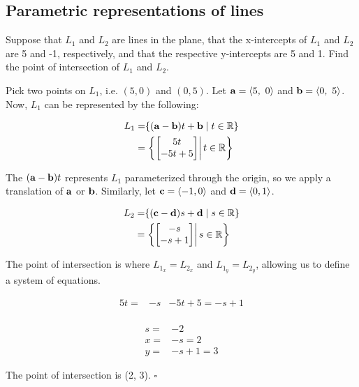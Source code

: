 \documentclass[../main.tex]{subfiles}
\begin{document}
\subsection{Parametric representations of lines}

\begin{example}
	Suppose that $L_1$ and $L_2$ are lines in the plane, that the
	x-intercepts of $L_1$ and $L_2$ are 5 and -1, respectively, and that the
	respective y-intercepts are 5 and 1. Find the point of intersection
	of $L_1$ and $L_2$.
\end{example}

\begin{solution}
	Pick two points on $L_1$,
	i.e. $(5, 0)$ and $(0, 5)$. Let $\mathbf{a}=\langle 5,\ 0\rangle$ and $\mathbf{b}=\langle 0,\ 5\rangle$.
	Now, $L_1$ can be represented by the following:

	\begin{equation*}
		\begin{split}
			L_1 = & \{ (\mathbf{a} - \mathbf{b})t + \mathbf{b} \mid t \in \mathbb{R} \}                            \\
			=     & \left. \left\{ \begin{bmatrix} 5t\\-5t+5 \end{bmatrix} \right| t \in \mathbb{R} \right\}
		\end{split}
	\end{equation*}

	The $(\mathbf{a} - \mathbf{b})t$ represents $L_1$ parameterized through the origin,
	so we apply a translation of $\mathbf{a}$ or $\mathbf{b}$. Similarly,
	let $\mathbf{c}= \langle -1, 0 \rangle$ and $\mathbf{d}= \langle 0, 1 \rangle$.

	\begin{equation*}
		\begin{split}
			L_2 = & \{ (\mathbf{c} - \mathbf{d})s + \mathbf{d} \mid s \in \mathbb{R} \}                             \\
			=     & \left. \left\{ \begin{bmatrix} -s \\ -s+1 \end{bmatrix} \right| s \in \mathbb{R} \right\}
		\end{split}
	\end{equation*}

	The point of intersection is where $L_{1_x}=L_{2_x}$ and $L_{1_y}=L_{2_y}$,
	allowing us to define a system of equations.

	\begin{align*}
		5t= & -s & -5t+5=-s+1 \\
	\end{align*}

	\begin{align*}
		s= & -2     \\
		x= & -s=2   \\
		y= & -s+1=3
	\end{align*}

	The point of intersection is (2, 3). $\square$
\end{solution}
\end{document}

